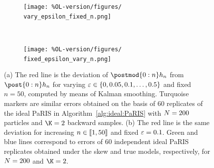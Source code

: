 \begin{figure}
    \centering
    \begin{subfigure}[b]{0.43\textwidth}
        \texttt{[image: \%OL-version/figures/
        vary\_epsilon\_fixed\_n.png]}
        \caption{}
        \label{fig:varying:precpar}
    \end{subfigure}
    ~ 
    \begin{subfigure}[b]{0.43\textwidth}
        \texttt{[image: \%OL-version/figures/
        fixed\_epsilon\_vary\_n.png]}
        \caption{}
        \label{fig:varying:n}
    \end{subfigure}
    \caption{(a) The red line is the deviation of $\postmod{0:n} h_n$ from $\post{0:n} h_n$ for varying $\varepsilon \in \{0, 0.05, 0.1, \ldots, 0.5 \}$ and fixed $n = 50$, computed by means of Kalman smoothing. Turquoise markers are similar errors obtained on the basis of $60$ replicates of the ideal PaRIS in Algorithm~\ref{alg:ideal:PaRIS} with $N = 200$ particles and $\K = 2$ backward samples. (b) The red line is the same deviation for increasing $n \in \llbracket 1, 50 \rrbracket$ and fixed $\varepsilon = 0.1$. Green and blue lines correspond to errors of $60$ independent ideal PaRIS replicates obtained under the skew and true models, respectively, for $N = 200$ and $\K = 2$.} \label{fig}
\end{figure}

